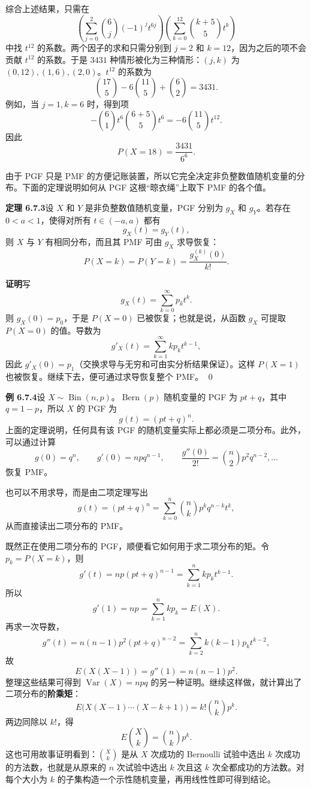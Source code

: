 \documentclass[UTF8, 12pt, fontset=fandol, oneside]{ctexart}
\begin{document}
综合上述结果，只需在
\[
  \left(\sum_{j=0}^{2}\binom{6}{j}(-1)^jt^{6j}\right)
  \left(\sum_{k=0}^{12}\binom{k+5}{5}t^k\right)
\]
中找 $t^{12}$ 的系数。两个因子的求和只需分别到 $j=2$ 和 $k=12$，因为之后的项不会贡献 $t^{12}$ 的系数。于是 $3431$ 种情形被化为三种情形：$(j,k)$ 为 $(0,12),(1,6),(2,0)$。$t^{12}$ 的系数为
\[
  \binom{17}{5}-6\binom{11}{5}+\binom{6}{2}=3431.
\]
例如，当 $j=1,k=6$ 时，得到项
\[
  -\binom61t^6\binom{6+5}{5}t^6=-6\binom{11}{5}t^{12}.
\]
因此
\[
  P(X=18)=\frac{3431}{6^6}.
\]

由于 PGF 只是 PMF 的方便记账装置，所以它完全决定非负整数值随机变量的分布。下面的定理说明如何从 PGF 这根“晾衣绳”上取下 PMF 的各个值。

\noindent\textbf{定理 6.7.3}\quad 设 $X$ 和 $Y$ 是非负整数值随机变量，PGF 分别为 $g_X$ 和 $g_Y$。若存在 $0<a<1$，使得对所有 $t\in(-a,a)$ 都有
\[
  g_X(t)=g_Y(t),
\]
则 $X$ 与 $Y$ 有相同分布，而且其 PMF 可由 $g_X$ 求导恢复：
\[
  P(X=k)=P(Y=k)=\frac{g_X^{(k)}(0)}{k!}.
\]

\noindent\textbf{证明}\quad 写
\[
  g_X(t)=\sum_{k=0}^{\infty}p_kt^k.
\]
则 $g_X(0)=p_0$，于是 $P(X=0)$ 已被恢复；也就是说，从函数 $g_X$ 可提取 $P(X=0)$ 的值。导数为
\[
  g'_X(t)=\sum_{k=1}^{\infty}kp_kt^{k-1},
\]
因此 $g'_X(0)=p_1$（交换求导与无穷和可由实分析结果保证）。这样 $P(X=1)$ 也被恢复。继续下去，便可通过求导恢复整个 PMF。
\qed

\noindent\textbf{例 6.7.4}\quad 设 $X\sim\operatorname{Bin}(n,p)$。$\operatorname{Bern}(p)$ 随机变量的 PGF 为 $pt+q$，其中 $q=1-p$，所以 $X$ 的 PGF 为
\[
  g(t)=(pt+q)^n.
\]
上面的定理说明，任何具有该 PGF 的随机变量实际上都必须是二项分布。此外，可以通过计算
\[
  g(0)=q^n,\qquad
  g'(0)=npq^{n-1},\qquad
  \frac{g''(0)}{2!}=\binom{n}{2}p^2q^{n-2},\ldots
\]
恢复 PMF。

也可以不用求导，而是由二项定理写出
\[
  g(t)=(pt+q)^n=\sum_{k=0}^{n}\binom{n}{k}p^kq^{n-k}t^k,
\]
从而直接读出二项分布的 PMF。

既然正在使用二项分布的 PGF，顺便看它如何用于求二项分布的矩。令 $p_k=P(X=k)$，则
\[
  g'(t)=np(pt+q)^{n-1}=\sum_{k=1}^n kp_kt^{k-1}.
\]
所以
\[
  g'(1)=np=\sum_{k=1}^{n}kp_k=E(X).
\]
再求一次导数，
\[
  g''(t)=n(n-1)p^2(pt+q)^{n-2}
  =
  \sum_{k=2}^{n}k(k-1)p_kt^{k-2},
\]
故
\[
  E(X(X-1))=g''(1)=n(n-1)p^2.
\]
整理这些结果可得到 $\operatorname{Var}(X)=npq$ 的另一种证明。继续这样做，就计算出了二项分布的\textbf{阶乘矩}：
\[
  E\bigl(X(X-1)\cdots(X-k+1)\bigr)=k!\binom{n}{k}p^k.
\]
两边同除以 $k!$，得
\[
  E\binom{X}{k}=\binom{n}{k}p^k.
\]
这也可用故事证明看到：$\binom{X}{k}$ 是从 $X$ 次成功的 Bernoulli 试验中选出 $k$ 次成功的方法数，也就是从原来的 $n$ 次试验中选出 $k$ 次且这 $k$ 次全都成功的方法数。对每个大小为 $k$ 的子集构造一个示性随机变量，再用线性性即可得到结论。
\end{document}
